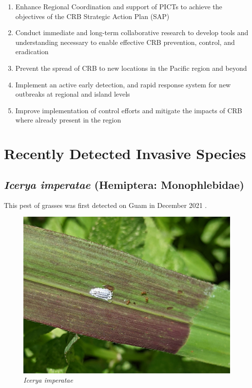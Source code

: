 \documentclass[twocolumn]{scrartcl}
\begin{document}
\begin{enumerate}
	\item Enhance Regional Coordination and support of PICTs to achieve the
	objectives of the CRB Strategic Action Plan (SAP)
	\item Conduct immediate and long-term collaborative research to develop
	tools and understanding necessary to enable effective CRB prevention, control, and
	eradication
	\item Prevent the spread of CRB to new locations in the Pacific region and
	beyond
	\item Implement an active early detection, and rapid response system for new
	outbreaks at regional and island levels
	\item Improve implementation of control efforts and mitigate the impacts of
	CRB where already present in the region
	
\end{enumerate} 

\section{Recently Detected Invasive Species}

\subsection{\textit{Icerya imperatae} (Hemiptera: Monophlebidae)}

This pest of grasses was first detected on Guam in December 2021 \cite{moore2021}.

\begin{figure}[H]
	\centering
	\includegraphics[width=\linewidth]{images/icerya}
	\caption{\textit{Icerya imperatae}}
	\label{fig:icerya}
\end{figure}
\end{document}
